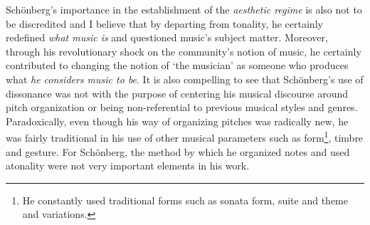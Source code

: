 Sch\"{o}nberg's importance in the establishment of the \emph{aesthetic regime} is also not to be discredited and I believe that by departing from tonality, he certainly redefined \emph{what music is} and questioned music's subject matter. Moreover, through his revolutionary shock on the community's notion of music, he certainly contributed to changing the notion of `the musician' as someone who produces what \emph{he considers music to be}. It is also compelling to see that Sch\"{o}nberg's use of dissonance was not with the purpose of centering his musical discourse around pitch organization or being non-referential to previous musical styles and genres. Paradoxically, even though his way of organizing pitches was radically new, he was fairly traditional in his use of other musical parameters such as form\footnote{He constantly used traditional forms such as sonata form, suite and theme and variations.}, timbre and gesture. For Sch\"{o}nberg, the method by which he organized notes and used atonality were not very important elements in his work.

